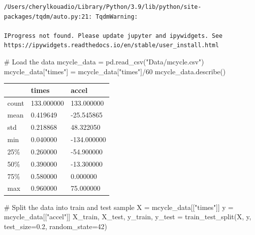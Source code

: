 \documentclass[
  letterpaper,
  DIV=11,
  numbers=noendperiod]{scrartcl}
\newenvironment{Shaded}{\begin{snugshade}}{\end{snugshade}}
\newcommand{\CommentTok}[1]{\textcolor[rgb]{0.37,0.37,0.37}{#1}}
\newcommand{\DecValTok}[1]{\textcolor[rgb]{0.68,0.00,0.00}{#1}}
\newcommand{\FloatTok}[1]{\textcolor[rgb]{0.68,0.00,0.00}{#1}}
\newcommand{\NormalTok}[1]{\textcolor[rgb]{0.00,0.23,0.31}{#1}}
\newcommand{\OperatorTok}[1]{\textcolor[rgb]{0.37,0.37,0.37}{#1}}
\newcommand{\StringTok}[1]{\textcolor[rgb]{0.13,0.47,0.30}{#1}}
\begin{document}
\begin{verbatim}
/Users/cherylkouadio/Library/Python/3.9/lib/python/site-packages/tqdm/auto.py:21: TqdmWarning:

IProgress not found. Please update jupyter and ipywidgets. See https://ipywidgets.readthedocs.io/en/stable/user_install.html
\end{verbatim}

\begin{Shaded}
\begin{Highlighting}[]
\CommentTok{\# Load the data}
\NormalTok{mcycle\_data }\OperatorTok{=}\NormalTok{ pd.read\_csv(}\StringTok{"Data/mcycle.csv"}\NormalTok{)}
\NormalTok{mcycle\_data[}\StringTok{"times"}\NormalTok{] }\OperatorTok{=}\NormalTok{ mcycle\_data[}\StringTok{"times"}\NormalTok{]}\OperatorTok{/}\DecValTok{60} 
\NormalTok{mcycle\_data.describe()}
\end{Highlighting}
\end{Shaded}

\begin{longtable}[]{@{}lll@{}}
\toprule\noalign{}
& times & accel \\
\midrule\noalign{}
\endhead
\bottomrule\noalign{}
\endlastfoot
count & 133.000000 & 133.000000 \\
mean & 0.419649 & -25.545865 \\
std & 0.218868 & 48.322050 \\
min & 0.040000 & -134.000000 \\
25\% & 0.260000 & -54.900000 \\
50\% & 0.390000 & -13.300000 \\
75\% & 0.580000 & 0.000000 \\
max & 0.960000 & 75.000000 \\
\end{longtable}

\begin{Shaded}
\begin{Highlighting}[]
\CommentTok{\# Split the data into train and test sample}
\NormalTok{X }\OperatorTok{=}\NormalTok{ mcycle\_data[[}\StringTok{"times"}\NormalTok{]]}
\NormalTok{y }\OperatorTok{=}\NormalTok{ mcycle\_data[[}\StringTok{"accel"}\NormalTok{]]}
\NormalTok{X\_train, X\_test, y\_train, y\_test }\OperatorTok{=}\NormalTok{ train\_test\_split(X, y, test\_size}\OperatorTok{=}\FloatTok{0.2}\NormalTok{, random\_state}\OperatorTok{=}\DecValTok{42}\NormalTok{)}
\end{Highlighting}
\end{Shaded}
\end{document}
